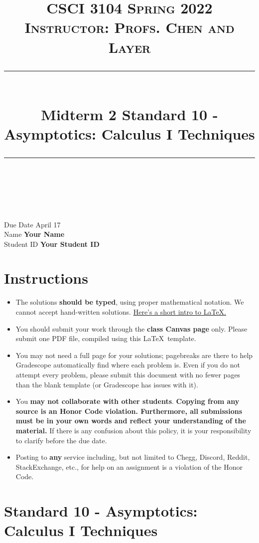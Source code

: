 \documentclass[11pt]{article}
\title{
\normalfont \normalsize 
\textsc{CSCI 3104 Spring 2022\\
Instructor: Profs. Chen and Layer} \\
[10pt] 
\rule{\linewidth}{0.5pt} \\[6pt] 
\huge Midterm 2 Standard 10 - Asymptotics: Calculus I Techniques \\
\rule{\linewidth}{2pt}  \\[10pt]
}
\date{}
\theoremstyle{definition}
\theoremstyle{definition}
\theoremstyle{definition}
\begin{document}
\maketitle


\noindent
Due Date \dotfill  April 17\\
Name \dotfill \textbf{Your Name} \\
Student ID \dotfill \textbf{Your Student ID} \\


\tableofcontents

\section{Instructions}
 \begin{itemize}
	\item The solutions \textbf{should be typed}, using proper mathematical notation. We cannot accept hand-written solutions. \href{http://ece.uprm.edu/~caceros/latex/introduction.pdf}{Here's a short intro to \LaTeX.}
	\item You should submit your work through the \textbf{class Canvas page} only. Please submit one PDF file, compiled using this \LaTeX \ template.
	\item You may not need a full page for your solutions; pagebreaks are there to help Gradescope automatically find where each problem is. Even if you do not attempt every problem, please submit this document with no fewer pages than the blank template (or Gradescope has issues with it).

	\item You \textbf{may not collaborate with other students}. \textbf{Copying from any source is an Honor Code violation. Furthermore, all submissions must be in your own words and reflect your understanding of the material.} If there is any confusion about this policy, it is your responsibility to clarify before the due date. 

	\item Posting to \textbf{any} service including, but not limited to Chegg, Discord, Reddit, StackExchange, etc., for help on an assignment is a violation of the Honor Code.

\end{itemize}


\newpage
\section{Standard 10 - Asymptotics: Calculus I Techniques}
\end{document}
